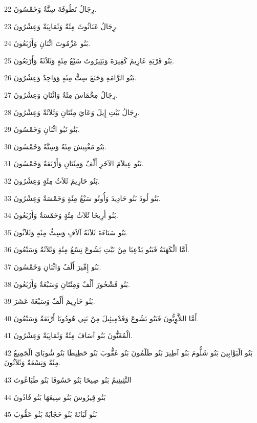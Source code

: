 \par 22 رِجَالُ نَطُوفَةَ سِتَّةٌ وَخَمْسُونَ.
\par 23 رِجَالُ عَنَاثُوثَ مِئَةٌ وَثَمَانِيَةٌ وَعِشْرُونَ.
\par 24 بَنُو عَزْمُوتَ اثْنَانِ وَأَرْبَعُونَ.
\par 25 بَنُو قَرْيَةِ عَارِيمَ كَفِيرَةَ وَبَئِيرُوتَ سَبْعُ مِئَةٍ وَثَلاَثَةٌ وَأَرْبَعُونَ.
\par 26 بَنُو الرَّامَةِ وَجَبَعَ سِتُّ مِئَةٍ وَوَاحِدٌ وَعِشْرُونَ.
\par 27 رِجَالُ مِخْمَاسَ مِئَةٌ وَاثْنَانِ وَعِشْرُونَ.
\par 28 رِجَالُ بَيْتِ إِيلَ وَعَايَ مِئَتَانِ وَثَلاَثَةٌ وَعِشْرُونَ.
\par 29 بَنُو نَبُو اثْنَانِ وَخَمْسُونَ.
\par 30 بَنُو مَغْبِيشَ مِئَةٌ وَسِتَّةٌ وَخَمْسُونَ.
\par 31 بَنُو عِيلاَمَ الآخَرِ أَلْفٌ وَمِئَتَانِ وَأَرْبَعَةٌ وَخَمْسُونَ.
\par 32 بَنُو حَارِيمَ ثَلاَثُ مِئَةٍ وَعِشْرُونَ.
\par 33 بَنُو لُودَ بَنُو حَادِيدَ وَأُونُو سَبْعُ مِئَةٍ وَخَمْسَةٌ وَعِشْرُونَ.
\par 34 بَنُو أَرِيحَا ثَلاَثُ مِئَةٍ وَخَمْسَةٌ وَأَرْبَعُونَ.
\par 35 بَنُو سَنَاءَةَ ثَلاَثَةُ آلاَفٍ وَسِتُّ مِئَةٍ وَثَلاَثُونَ.
\par 36 أَمَّا الْكَهَنَةُ فَبَنُو يَدْعِيَا مِنْ بَيْتِ يَشُوعَ تِسْعُ مِئَةٍ وَثَلاَثَةٌ وَسَبْعُونَ.
\par 37 بَنُو إِمِّيرَ أَلْفٌ وَاثْنَانِ وَخَمْسُونَ.
\par 38 بَنُو فَشْحُورَ أَلْفٌ وَمِئَتَانِ وَسَبْعَةٌ وَأَرْبَعُونَ.
\par 39 بَنُو حَارِيمَ أَلْفٌ وَسَبْعَةَ عَشَرَ.
\par 40 أَمَّا اللاَّوِيُّونَ فَبَنُو يَشُوعَ وَقَدْمِيئِيلَ مِنْ بَنِي هُودُويَا أَرْبَعَةٌ وَسَبْعُونَ.
\par 41 الْمُغَنُّونَ بَنُو آسَافَ مِئَةٌ وَثَمَانِيَةٌ وَعِشْرُونَ.
\par 42 بَنُو الْبَوَّابِينَ بَنُو شَلُّومَ بَنُو آطِيرَ بَنُو طَلْمُونَ بَنُو عَقُّوبَ بَنُو حَطِيطَا بَنُو شُوبَايَ الْجَمِيعُ مِئَةٌ وَتِسْعَةٌ وَثَلاَثُونَ.
\par 43 النَّثِينِيمُ بَنُو صِيحَا بَنُو حَسُوفَا بَنُو طَبَاعُوتَ
\par 44 بَنُو قِيرُوسَ بَنُو سِيعَهَا بَنُو فَادُونَ
\par 45 بَنُو لَبَانَةَ بَنُو حَجَابَةَ بَنُو عَقُّوبَ

